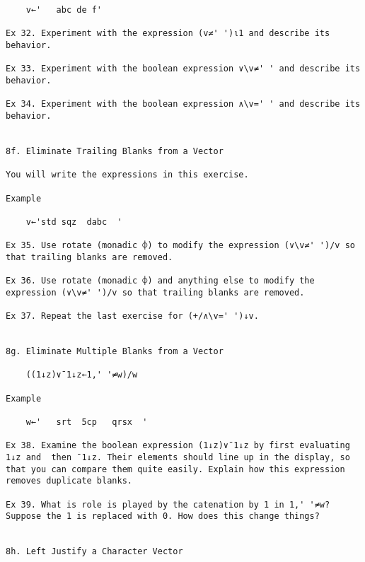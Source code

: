\documentclass{article}
\begin{document}
\begin{verbatim}
	v←'   abc de f'                                                      

Ex 32. Experiment with the expression (v≠' ')⍳1 and describe its      
behavior.                                                             

Ex 33. Experiment with the boolean expression ∨\v≠' ' and describe its
behavior.                                                             

Ex 34. Experiment with the boolean expression ∧\v=' ' and describe its
behavior.                                                             


8f. Eliminate Trailing Blanks from a Vector                           

You will write the expressions in this exercise.                      

Example                                                               

	v←'std sqz  dabc  '                                                  

Ex 35. Use rotate (monadic ⌽) to modify the expression (∨\v≠' ')/v so 
that trailing blanks are removed.                                     

Ex 36. Use rotate (monadic ⌽) and anything else to modify the         
expression (∨\v≠' ')/v so that trailing blanks are removed.           

Ex 37. Repeat the last exercise for (+/∧\v=' ')↓v.                    


8g. Eliminate Multiple Blanks from a Vector                           

	((1↓z)∨¯1↓z←1,' '≠w)/w                                               

Example                                                               

	w←'   srt  5cp   qrsx  '                                             

Ex 38. Examine the boolean expression (1↓z)∨¯1↓z by first evaluating  
1↓z and  then ¯1↓z. Their elements should line up in the display, so  
that you can compare them quite easily. Explain how this expression   
removes duplicate blanks.                                             

Ex 39. What is role is played by the catenation by 1 in 1,' '≠w? 
Suppose the 1 is replaced with 0. How does this change things?     


8h. Left Justify a Character Vector                                   


\end{verbatim}
\end{document}
